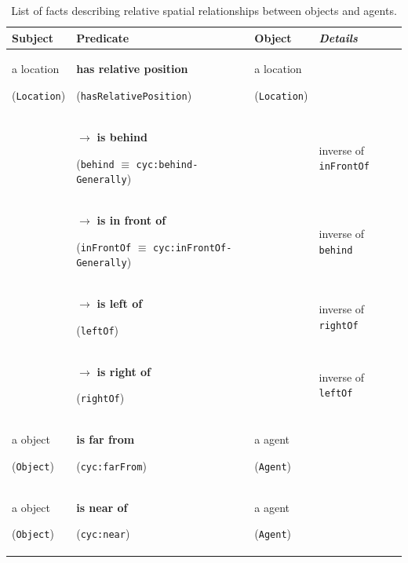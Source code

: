 \documentclass{svmult}
\newcommand{\concept}[1]{{\footnotesize \texttt{#1}}}
\begin{document}
\begin{table}[h]
	\centering
	    \begin{tabular}{p{2cm}p{5cm}p{2cm}l}
		\rowcolor{white}
		\textbf{Subject} & \textbf{Predicate} & \textbf{Object} & \emph{Details} \\
		\hline
	 a location	\par (\concept{Location})  & \textbf{has relative position}	\par (\concept{hasRelativePosition})  &  a location	\par (\concept{Location}) & \\ 
	 & 	$\rightarrow$ \textbf{is behind} \par (\concept{behind} $\equiv$ \concept{cyc:behind-Generally})  &  & inverse of \concept{inFrontOf}  \\ 
	 &  $\rightarrow$ \textbf{is in front of} \par (\concept{inFrontOf} $\equiv$ \concept{cyc:inFrontOf-Generally})  & 	 & 	 inverse of \concept{behind}  \\ 
	 &  $\rightarrow$ \textbf{is left of} \par (\concept{leftOf})  &  &  inverse of \concept{rightOf} \\ 
	 &  $\rightarrow$ \textbf{is right of} \par (\concept{rightOf})  & 	 & 	 inverse of \concept{leftOf}  \\ 
	 a object \par (\concept{Object})  & \textbf{is far from}	\par (\concept{cyc:farFrom})  &  a agent \par (\concept{Agent}) & \\ 
	 a object \par (\concept{Object})  & \textbf{is near of} \par (\concept{cyc:near})  &  a agent \par (\concept{Agent}) & 
	\end{tabular}
	\caption{List of facts describing relative spatial relationships between objects and agents.}
\end{table}
\end{document}
